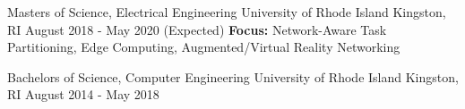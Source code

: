 \gradheader
\begin{cventries}
  \cventry
    {Masters of Science, Electrical Engineering}
    {University of Rhode Island}
    {Kingston, RI}
    {August 2018 - May 2020 (Expected)}
    {\textbf{Focus:} Network-Aware Task Partitioning, Edge Computing, Augmented/Virtual Reality Networking}
\end{cventries}
\ugradheader
\begin{cventries}
  \cventry
  {Bachelors of Science, Computer Engineering}
  {University of Rhode Island}
  {Kingston, RI}
  {August 2014 - May 2018}
  {}
\end{cventries}
